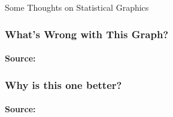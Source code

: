 \documentclass{beamer}
\date{Bonus Lecture: Statistical Graphics}
\begin{document}
 





\begin{frame}[plain]
	\titlepage 
	

\end{frame} 

\begin{frame}

\Huge \centering Some Thoughts on Statistical Graphics

\end{frame}
\begin{frame}
\frametitle{What's Wrong with This Graph?}
\framesubtitle{Source: \href{http://www.climatecentral.org/news/noaa-2012-was-warmest-and-second-most-extreme-year-on-record-15436}{}}
	\begin{figure}
\end{figure}
\end{frame}
\begin{frame}
\frametitle{Why is this one better?}
\framesubtitle{Source: \href{http://www.climatecentral.org/news/noaa-2012-was-warmest-and-second-most-extreme-year-on-record-15436}{}}
	\begin{figure}
\end{figure}
\end{frame}
\end{document}
